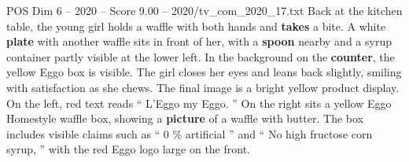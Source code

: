 \begin{textsample}{POS Dim 6 – 2020 – Score 9.00 – 2020/tv\_com\_2020\_17.txt}
Back at the kitchen table, the young girl holds a waffle with both hands and \textbf{takes} a bite.
A white \textbf{plate} with another waffle sits in front of her, with a \textbf{spoon} nearby and a syrup container partly visible at the lower left.
In the background on the \textbf{counter}, the yellow Eggo box is visible.
The girl closes her eyes and leans back slightly, smiling with satisfaction as she chews.
The final image is a bright yellow product display.
On the left, red text reads “ L’Eggo my Eggo. ” On the right sits a yellow Eggo Homestyle waffle box, showing a \textbf{picture} of a waffle with butter.
The box includes visible claims such as “ 0 \% artificial ” and “ No high fructose corn syrup, ” with the red Eggo logo large on the front.

\end{textsample}
